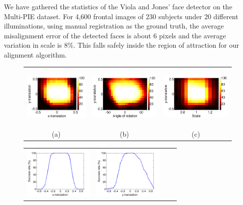\documentclass[10pt,journal,letterpaper,compsoc]{IEEEtran} %
\begin{document}
We have gathered the statistics of the Viola and Jones'
 face detector on the Multi-PIE dataset. For 4,600 frontal
 images of 230 subjects under 20 different illuminations,
 using manual registration as the ground truth, the average
 misalignment error of the detected faces is about 6 pixels
 and the average variation in scale is 8\%. This falls
 safely inside the region of attraction for our alignment
 algorithm.
\begin{figure}
\centering
{\small
\begin{tabular}{ccc}
\includegraphics[height=1.2in]{figures_pami/x_y_roa.png} &
\includegraphics[height=1.2in]{figures_pami/y_theta_roa.png} &
\includegraphics[height=1.2in]{figures_pami/y_s_roa.png}\\
(a)&(b)&(c)
\end{tabular}
\begin{tabular}{cccc}
\includegraphics[height=1in]{figures_pami/x_tr.png} &
\includegraphics[height=1in]{figures_pami/y_tr.png} &

\end{tabular}}
\end{figure}
\end{document}
